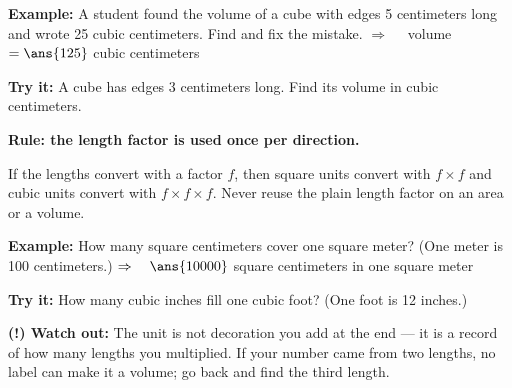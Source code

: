 \documentclass[12pt]{article}
\begin{document}
\begin{examplebox}
\textbf{Example:} \quad A student found the volume of a cube with edges 5 centimeters long
and wrote 25 cubic centimeters. Find and fix the mistake.
$\Rightarrow\quad$ volume $= \ans{125}$ cubic centimeters
\end{examplebox}

\begin{tryitbox}
\textbf{Try it:} \quad A cube has edges 3 centimeters long. Find its volume in cubic
centimeters.\\[2pt]
\end{tryitbox}


\begin{formulabox}
\textbf{Rule: the length factor is used once per direction.}\par
If the lengths convert with a factor $f$, then square units convert with $f \times f$ and
cubic units convert with $f \times f \times f$. Never reuse the plain length factor on an
area or a volume.
\end{formulabox}

\begin{examplebox}
\textbf{Example:} \quad How many square centimeters cover one square meter? (One meter is
100 centimeters.)
$\Rightarrow\quad \ans{10000}$ square centimeters in one square meter
\end{examplebox}

\begin{tryitbox}
\textbf{Try it:} \quad How many cubic inches fill one cubic foot? (One foot is 12
inches.)\\[2pt]
\end{tryitbox}

\begin{watchoutbox}
\textbf{(!) Watch out:} The unit is not decoration you add at the end --- it is a record
of how many lengths you multiplied. If your number came from two lengths, no label can
make it a volume; go back and find the third length.
\end{watchoutbox}
\end{document}
